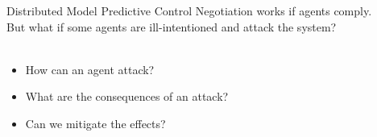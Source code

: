 \documentclass[aspectratio=169]{beamer}
\begin{document}
\begin{frame}{Distributed Model Predictive Control}
  Negotiation works if agents comply.\\\pause
  But what if some agents are ill-intentioned and attack the system?\\~\\\pause
  \begin{itemize}[<+->]
    \item How can an agent attack?
    \item What are the consequences of an attack?
    \item Can we mitigate the effects?
  \end{itemize}
\centering
{}
\end{frame}
\end{document}
